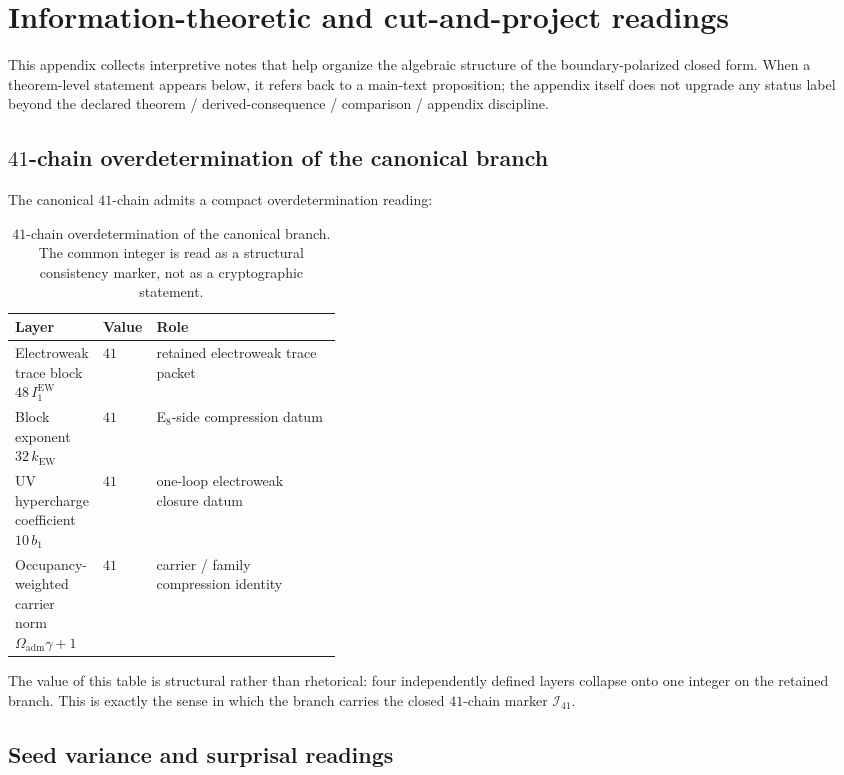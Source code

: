 \documentclass[11pt,a4paper]{article}
\theoremstyle{definition}
\theoremstyle{remark}
\newcommand{\Oadm}{\Omega_{\mathrm{adm}}}
\begin{document}
\section{Information-theoretic and cut-and-project readings}
\label{app:info-readings}

This appendix collects interpretive notes that help organize the algebraic structure of the
boundary-polarized closed form. When a theorem-level statement appears below, it refers back to a
main-text proposition; the appendix itself does not upgrade any status label beyond the declared
theorem / derived-consequence / comparison / appendix discipline.

\subsection{\texorpdfstring{$41$}{41}-chain overdetermination of the canonical branch}

The canonical $41$-chain admits a compact overdetermination reading:

\begin{table}[H]
\centering
\small
\begin{tabularx}{\linewidth}{@{}>{\raggedright\arraybackslash}p{0.26\linewidth}>{\raggedleft\arraybackslash}p{0.12\linewidth}Y@{}}
\toprule
Layer & Value & Role \\
\midrule
Electroweak trace block $48\,I_1^{\mathrm{EW}}$ & $41$ & retained electroweak trace packet \\
Block exponent $32\,k_{\mathrm{EW}}$ & $41$ & E$_8$-side compression datum \\
UV hypercharge coefficient $10\,b_1$ & $41$ & one-loop electroweak closure datum \\
Occupancy-weighted carrier norm $\Oadm\gamma+1$ & $41$ & carrier / family compression identity \\
\bottomrule
\end{tabularx}
\caption{$41$-chain overdetermination of the canonical branch. The common integer is read as a
structural consistency marker, not as a cryptographic statement.}
\label{tab:checksum-41}
\end{table}

The value of this table is structural rather than rhetorical: four independently defined layers
collapse onto one integer on the retained branch. This is exactly the sense in which the branch
carries the closed $41$-chain marker $\mathcal I_{41}$.

\subsection{Seed variance and surprisal readings}
\end{document}
